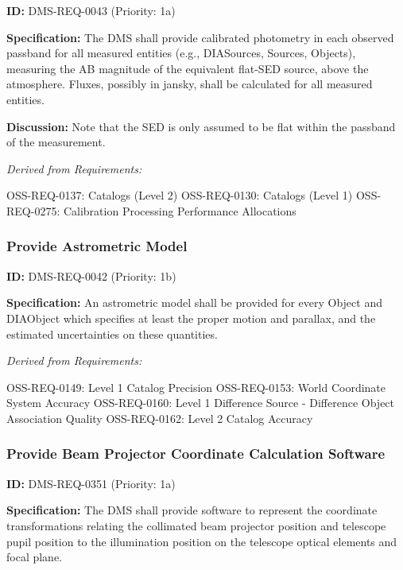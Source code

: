 \documentclass[SE,toc,lsstdraft]{lsstdoc}
\begin{document}
\label{DMS-REQ-0043}
\textbf{ID:} DMS-REQ-0043 (Priority: 1a)

\textbf{Specification:} The DMS shall provide calibrated photometry in each observed passband for all measured entities (e.g., DIASources, Sources, Objects), measuring the AB magnitude of the equivalent flat-SED source, above the atmosphere. Fluxes, possibly in jansky, shall be calculated for all measured entities.

\textbf{Discussion: }Note that the SED is only assumed to be flat within the passband of the measurement.

\emph{Derived from Requirements:}

OSS-REQ-0137:
Catalogs (Level 2) \newline
OSS-REQ-0130:
Catalogs (Level 1) \newline
OSS-REQ-0275:
Calibration Processing Performance Allocations \newline

\subsubsection{Provide Astrometric Model}

\label{DMS-REQ-0042}
\textbf{ID:} DMS-REQ-0042 (Priority: 1b)

\textbf{Specification:} An astrometric model shall be provided for every Object and DIAObject which specifies at least the proper motion and parallax, and the estimated uncertainties on these quantities.

\emph{Derived from Requirements:}

OSS-REQ-0149:
Level 1 Catalog Precision \newline
OSS-REQ-0153:
World Coordinate System Accuracy \newline
OSS-REQ-0160:
Level 1 Difference Source - Difference Object Association Quality \newline
OSS-REQ-0162:
Level 2 Catalog Accuracy \newline

\subsubsection{Provide Beam Projector Coordinate Calculation Software}

\label{DMS-REQ-0351}
\textbf{ID:} DMS-REQ-0351 (Priority: 1a)

\textbf{Specification:}  The DMS shall provide software to represent the coordinate transformations relating the collimated beam projector position and telescope pupil position to the illumination position on the telescope optical elements and focal plane.
\end{document}
